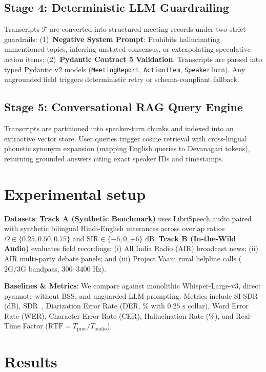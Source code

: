 \documentclass[11pt,a4paper,twocolumn]{article}
\begin{document}
\subsection{Stage 4: Deterministic LLM Guardrailing}
Transcripts $\mathcal{T}$ are converted into structured meeting records under two strict guardrails: (1)~\textbf{Negative System Prompt}: Prohibits hallucinating unmentioned topics, inferring unstated consensus, or extrapolating speculative action items; (2)~\textbf{Pydantic Contract 5 Validation}: Transcripts are parsed into typed Pydantic v2 models (\texttt{MeetingReport}, \texttt{ActionItem}, \texttt{SpeakerTurn}). Any ungrounded field triggers deterministic retry or schema-compliant fallback.

\subsection{Stage 5: Conversational RAG Query Engine}
Transcripts are partitioned into speaker-turn chunks and indexed into an extractive vector store. User queries trigger cosine retrieval with cross-lingual phonetic synonym expansion (mapping English queries to Devanagari tokens), returning grounded answers citing exact speaker IDs and timestamps.

\section{Experimental setup}
\textbf{Datasets}: \textbf{Track A (Synthetic Benchmark)} uses LibriSpeech audio paired with synthetic bilingual Hindi-English utterances across overlap ratios $\Omega \in \{0.25, 0.50, 0.75\}$ and $\text{SIR} \in \{-6, 0, +6\}\text{ dB}$. \textbf{Track B (In-the-Wild Audio)} evaluates field recordings: (i) All India Radio (AIR) broadcast news; (ii) AIR multi-party debate panels; and (iii) Project Vaani rural helpline calls ($2\text{G}/3\text{G}$ bandpass, $300\text{--}3400\text{ Hz}$).

\textbf{Baselines \& Metrics}: We compare against monolithic Whisper-Large-v3, direct pyannote without BSS, and unguarded LLM prompting. Metrics include SI-SDR (dB), SDR~\cite{vincent2006performance}, Diarization Error Rate (DER, $\%$ with $0.25\text{ s}$ collar), Word Error Rate (WER), Character Error Rate (CER), Hallucination Rate ($\%$), and Real-Time Factor ($\text{RTF} = T_{\text{proc}} / T_{\text{audio}}$).

\section{Results}
\end{document}
